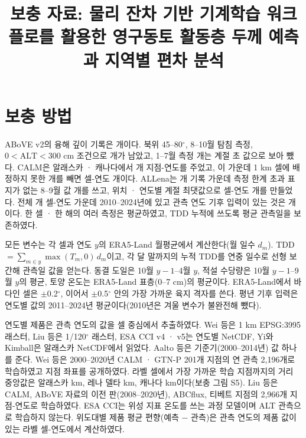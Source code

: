 \documentclass[pdflatex,sn-nature]{sn-jnl}
\begin{document}
\title{보충 자료: 물리 잔차 기반 기계학습 워크플로를 활용한 영구동토 활동층 두께 예측과 지역별 편차 분석}
\author[1]{}
\maketitle

\section{보충 방법}

ABoVE v2\cite{Moore2025}의 융해 깊이 기록은 \nqcAboveRaw{}개이다. 북위 45--80$^\circ$, 8--10월 탐침 측정, $0<\mathrm{ALT}<300$ cm 조건으로 \nqcAboveKept{}개가 남았고, 1--7월 측정 \nqcAboveEarly{}개는 계절 초 값으로 보아 뺐다. CALM\cite{Streletskiy2025}은 알래스카 · 캐나다에서 \nqcCalmSy{}개 지점-연도를 주었고, 이 가운데 1 km 셀에 배정하지 못한 \nqcCalmNoloc{}개를 빼면 셀-연도 \nqcCalmCy{}개이다. ALLena\cite{Veremeeva2025}는 \nqcLenaRaw{}개 기록 가운데 측정 한계 초과 표지가 없는 8--9월 값 \nqcLenaEos{}개를 쓰고, 위치 · 연도별 계절 최댓값으로 셀-연도 \nqcLenaCy{}개를 만들었다. 전체 \nqcTotalCy{}개 셀-연도 가운데 2010--2024년에 있고 관측 연도 기후 입력이 있는 것은 \nqcTotalCyIn{}개이다. 한 셀 · 한 해의 여러 측정은 평균하였고, TDD 누적에 쓰도록 평균 관측일을 보존하였다.

모든 변수는 각 셀과 연도 $y$의 ERA5-Land 월평균에서 계산한다(월 일수 $d_m$). TDD $=\sum_{m\in y}\max(T_m,0)\,d_m$이고, 각 달 말까지의 누적 TDD를 연중 일수로 선형 보간해 관측일 값을 얻는다. 동결 도일은 10월 $y-1$--4월 $y$, 적설 수당량은 10월 $y-1$--9월 $y$의 평균, 토양 온도는 ERA5-Land 표층(0--7 cm)의 평균이다. ERA5-Land에서 바다인 셀은 $\pm$0.2$^\circ$, 이어서 $\pm$0.5$^\circ$ 안의 가장 가까운 육지 격자를 쓴다. 평년 기후 입력은 연도별 값의 2011--2024년 평균이다(2010년은 겨울 변수가 불완전해 뺐다).

연도별 제품은 관측 연도의 값을 셀 중심에서 추출하였다. Wei 등\cite{Wei2026}은 1 km EPSG:3995 래스터, Liu 등\cite{Liu2024}은 1/120$^\circ$ 래스터, ESA CCI v4 · v5\cite{Westermann2024,Westermann2025}는 연도별 NetCDF, Yi와 Kimball\cite{YiKimball2019}은 알래스카 NetCDF에서 읽었다. Aalto 등\cite{Aalto2018}은 기준기(2000--2014년) 값 하나를 준다. Wei 등은 2000--2020년 CALM · GTN-P 201개 지점의 연 관측 2,196개로 학습하였고 지점 좌표를 공개하였다. 라벨 셀에서 가장 가까운 학습 지점까지의 거리 중앙값은 알래스카 \ndistweiAkmed{} km, 레나 델타 \ndistweiLemed{} km, 캐나다 \ndistweiCamed{} km이다(보충 그림 S5). Liu 등은 CALM, ABoVE 자료의 이전 판(2008--2020년), ABCflux, 티베트 지점의 2,966개 지점-연도로 학습하였다. ESA CCI는 위성 지표 온도를 쓰는 과정 모델이며 ALT 관측으로 학습하지 않는다. 위도대별 제품 평균 편향(예측 − 관측)은 관측 연도의 제품 값이 있는 라벨 셀-연도에서 계산하였다.
\end{document}
